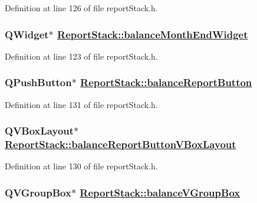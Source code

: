 Definition at line 126 of file report\-Stack.h.\hypertarget{classReportStack_r48}{
\subsubsection[balanceMonthEndWidget]{\setlength{\rightskip}{0pt plus 5cm}QWidget$\ast$ \hyperlink{classReportStack_r48}{Report\-Stack::balance\-Month\-End\-Widget}}}
\label{classReportStack_r48}


Definition at line 123 of file report\-Stack.h.\hypertarget{classReportStack_r56}{
\subsubsection[balanceReportButton]{\setlength{\rightskip}{0pt plus 5cm}QPush\-Button$\ast$ \hyperlink{classReportStack_r56}{Report\-Stack::balance\-Report\-Button}}}
\label{classReportStack_r56}


Definition at line 131 of file report\-Stack.h.\hypertarget{classReportStack_r55}{
\subsubsection[balanceReportButtonVBoxLayout]{\setlength{\rightskip}{0pt plus 5cm}QVBox\-Layout$\ast$ \hyperlink{classReportStack_r55}{Report\-Stack::balance\-Report\-Button\-VBox\-Layout}}}
\label{classReportStack_r55}


Definition at line 130 of file report\-Stack.h.\hypertarget{classReportStack_r47}{
\subsubsection[balanceVGroupBox]{\setlength{\rightskip}{0pt plus 5cm}QVGroup\-Box$\ast$ \hyperlink{classReportStack_r47}{Report\-Stack::balance\-VGroup\-Box}}}
\label{classReportStack_r47}


